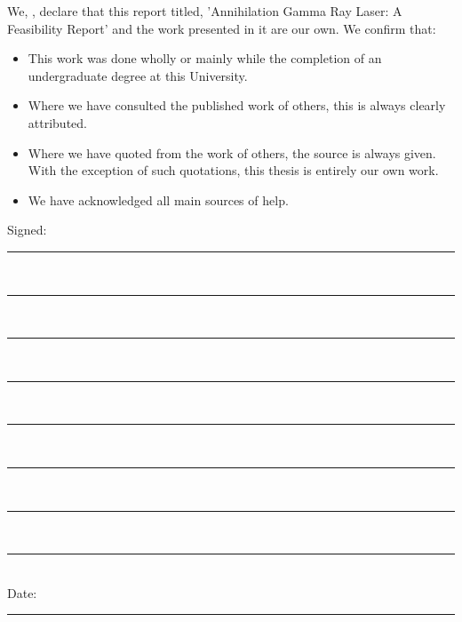 \documentclass[11pt, english, singlespacing, headsepline,]{FinalReport}
\begin{document}

\begin{declaration}
\addchaptertocentry{\authorshipname}

\noindent We, \authorname, declare that this report titled, 'Annihilation Gamma Ray Laser: A Feasibility Report' and the work presented in it are our own. We confirm that:

\begin{itemize} 
 \item This work was done wholly or mainly while the completion of an undergraduate degree at this University.
 \item Where we have consulted the published work of others, this is always clearly attributed.
 \item Where we have quoted from the work of others, the source is always given. With the exception of such quotations, this thesis is entirely our own work.
 \item We have acknowledged all main sources of help.
\end{itemize}
 
\noindent Signed:\\
\rule[0.5em]{25em}{0.5pt}\\ %
\rule[0.5em]{25em}{0.5pt}\\
\rule[0.5em]{25em}{0.5pt}\\
\rule[0.5em]{25em}{0.5pt}\\
\rule[0.5em]{25em}{0.5pt}\\
\rule[0.5em]{25em}{0.5pt}\\
\rule[0.5em]{25em}{0.5pt}\\
\rule[0.5em]{25em}{0.5pt}\\
 
\noindent Date:\\
\rule[0.5em]{25em}{0.5pt} %
\end{declaration}

\cleardoublepage

\end{document}
